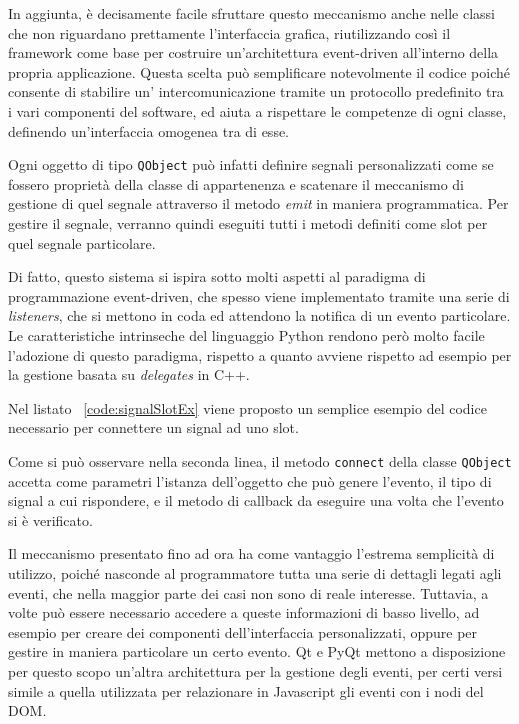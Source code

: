 In aggiunta, è decisamente facile sfruttare questo meccanismo anche nelle classi che non riguardano prettamente l'interfaccia grafica, riutilizzando così il framework come base per costruire un'architettura event-driven all'interno della propria applicazione. Questa scelta può semplificare notevolmente il codice poiché consente di stabilire un' intercomunicazione tramite un protocollo predefinito tra i vari componenti del software, ed aiuta a rispettare le competenze di ogni classe, definendo un'interfaccia omogenea tra di esse. 

Ogni oggetto di tipo \verb|QObject| può infatti definire segnali personalizzati come se fossero proprietà della classe di appartenenza e scatenare il meccanismo di gestione di quel segnale attraverso il metodo \emph{emit} in maniera programmatica. Per gestire il segnale, verranno quindi eseguiti tutti i metodi definiti come slot per quel segnale particolare.

Di fatto, questo sistema si ispira sotto molti aspetti al paradigma di programmazione event-driven, che spesso viene implementato tramite una serie di \emph{listeners}, che si mettono in coda ed attendono la notifica di un evento particolare. Le caratteristiche intrinseche del linguaggio Python rendono però molto facile l'adozione di questo paradigma, rispetto a quanto avviene rispetto ad esempio per la gestione basata su \emph{delegates} in C++. 

Nel listato ~\ref{code:signalSlotEx} viene proposto un semplice esempio del codice necessario per connettere un signal ad uno slot.



Come si può osservare nella seconda linea, il metodo \verb|connect| della classe \verb|QObject| accetta come parametri l'istanza dell'oggetto che può genere l'evento, il tipo di signal a cui rispondere, e il metodo di callback da eseguire una volta che l'evento si è verificato.

Il meccanismo presentato fino ad ora ha come vantaggio l'estrema semplicità di utilizzo, poiché nasconde al programmatore tutta una serie di dettagli legati agli eventi, che nella maggior parte dei casi non sono di reale interesse. Tuttavia, a volte può essere necessario accedere a queste informazioni di basso livello, ad esempio per creare dei componenti dell'interfaccia personalizzati, oppure per gestire in maniera particolare un certo evento. Qt e PyQt mettono a disposizione per questo scopo un'altra architettura per la gestione degli eventi, per certi versi simile a quella utilizzata per relazionare in Javascript gli eventi con i nodi del DOM. 

